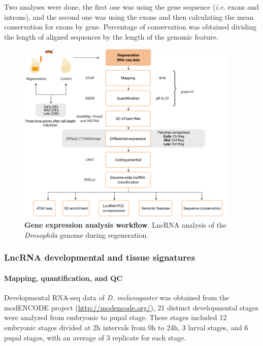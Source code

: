 Two analyses were done, the first one was using the gene sequence (\textit{i.e.} exons and introns), and the second one was using the exons and then calculating the mean conservation for exons by gene. Percentage of conservation was obtained dividing the length of aligned sequences by the length of the genomic feature.

\begin{figure}[!htb]
  \centering
  \includegraphics[width=0.95\textwidth]{img/methods/regeneration/lncRNA-pipeline-thesis.png}
  \caption[Gene expression analysis workflow]{\textbf{Gene expression analysis workflow}. LncRNA analysis of the \textit{Drosophila} genome during regeneration.}
  \label{fig:reg-ge-workflow}
\end{figure}

\clearpage

\subsubsection{LncRNA developmental and tissue signatures}
\label{sec:dme-methods-part-two}

\paragraph{Mapping, quantification, and QC}
\label{paragraph:modencode-erc-first-part}

Developmental RNA-seq data of \textit{D. melanogaster} was obtained from the modENCODE project\autocite{celniker_2009,modencode_2010} (\url{http://modencode.org/}), 21 distinct developmental stages were analyzed from embryonic to pupal stage. These stages included 12 embryonic stages divided at 2h intervals from 0h to 24h, 3 larval stages, and 6 pupal stages, with an average of 3 replicate for each stage.

